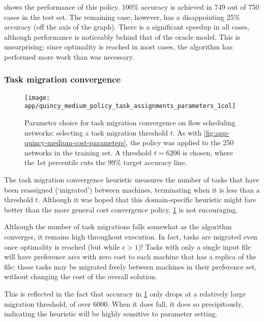  shows the performance of this policy. 100\% accuracy is achieved in 749 out of 750 cases in the test set. The remaining case, however, has a disappointing 25\% accuracy (off the axis of the graph). There is a significant speedup in all cases, although performance is noticeably behind that of the oracle model. This is unsurprising: since optimality is reached in most cases, the algorithm has performed more work than was necessary.

\subsubsection{Task migration convergence}

\begin{figure}
    \centering
    \texttt{[image: app/quincy\_medium\_policy\_task\_assignments\_parameters\_1col]}
    \caption[Parameter choice for task migration convergence with flow scheduling]{Parameter choice for task migration convergence on flow scheduling networks: selecting a task migration threshold $t$. As with \cref{fig:app-quincy-medium-cost-parameters}, the policy was applied to the 250 networks in the training set. A threshold $t=6206$ is chosen, where the {\color{matplotlib_blue} 1st percentile} cuts the 99\% target accuracy line.}
    \label{fig:app-quincy-medium-task-assignment-parameters}
\end{figure}

The task migration convergence heuristic measures the number of tasks that have been reassigned (`migrated') between machines, terminating when it is less than a threshold $t$. Although it was hoped that this domain-specific heuristic might fare better than the more general cost convergence policy, \cref{fig:app-quincy-medium-task-assignment-parameters} is not encouraging. 

Although the number of task migrations falls somewhat as the algorithm converges, it remains high throughout execution. In fact, tasks are migrated even once optimality is reached (but while $\epsilon > 1$)! Tasks with only a single input file will have preference arcs with zero cost to each machine that has a replica of the file; these tasks may be migrated freely between machines in their preference set, without changing the cost of the overall solution.

This is reflected in the fact that accuracy in \cref{fig:app-quincy-medium-task-assignment-parameters} only drops at a relatively large migration threshold, of over $6000$. When it does fall, it does so precipitously, indicating the heuristic will be highly sensitive to parameter setting.


